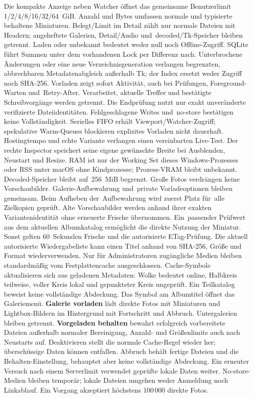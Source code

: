 \documentclass[11pt,a4paper]{article}
\newcommand{\ui}[1]{\textbf{#1}}
\begin{document}
Die kompakte Anzeige neben Watcher öffnet das gemeinsame Benutzerlimit
1/2/4/8/16/32/64~GiB. Anzahl und Bytes umfassen normale und typisierte behaltene
Miniaturen. Belegt/Limit im Detail zählt nur normale Dateien mit Headern;
angeheftete Galerien, Detail/Audio und~decoded/Tk-Speicher
bleiben getrennt. Laden oder unbekannt bedeutet weder null noch Offline-Zugriff.
SQLite führt Summen unter dem vorhandenen Lock per Differenz nach. Unterbrochene
Änderungen oder eine neue Verzeichnisgeneration verlangen begrenzten,
abbrechbaren Metadatenabgleich außerhalb Tk; der Index ersetzt weder Zugriff
noch SHA-256. Vorladen zeigt sofort Aktivität, auch bei Prüfungen,
Foreground-Warten und~Retry-After. Verarbeitet, aktuelle Treffer und bestätigte
Schreibvorgänge werden getrennt. Die Endprüfung nutzt nur exakt unveränderte
verifizierte Dateiidentitäten. Fehlgeschlagene Writes und~no-store bestätigen
keine Vollständigkeit. Serielles FIFO erhält Viewport/Watcher-Zugriff;
spekulative Warm-Queues blockieren explizites Vorladen nicht dauerhaft.
Hostingtempo und echte Variante verlangen einen vereinbarten Live-Test.
Der rechte Inspector speichert seine eigene gewünschte Breite bei Ausblenden,
Neustart und Resize. RAM ist nur der Working Set dieses Windows-Prozesses
oder RSS unter macOS ohne Kindprozesse; Prozess-VRAM bleibt unbekannt.
Decoded-Speicher bleibt auf~256~MiB begrenzt.
Große Fotos verdrängen keine Vorschaubilder. Galerie-Aufbewahrung und~private
Vorladeoptionen bleiben gemeinsam. Beim Aufheben der~Aufbewahrung wird zuerst
Platz für~alle Zielkopien geprüft. Alte Vorschaubilder werden anhand ihrer
exakten Variantenidentität ohne erneuerte Frische übernommen. Ein~passender Prüfwert aus
dem aktuellen Albumkatalog ermöglicht die direkte Nutzung der Miniatur.
Sonst gelten 60~Sekunden Frische und die autorisierte ETag-Prüfung.
Die aktuell autorisierte Wiedergabeliste kann einen Titel anhand von SHA-256,
Größe und Format wiederverwenden. Nur für Administratoren zugängliche Medien
bleiben standardmäßig vom Festplattencache ausgeschlossen.
Cache-Symbole aktualisieren sich aus geladenen Metadaten: Wolke bedeutet
online, Halbkreis teilweise, voller Kreis lokal und gepunkteter Kreis
ungeprüft. Ein Teilkatalog beweist keine vollständige Abdeckung. Das Symbol
am Albumtitel öffnet das Galeriemenü.
\ui{Galerie vorladen} lädt direkte Fotos mit Miniaturen und Lightbox-Bildern
im Hintergrund mit Fortschritt und Abbruch. Untergalerien bleiben getrennt.
\ui{Vorgeladen behalten} bewahrt erfolgreich vorbereitete Dateien außerhalb
normaler Bereinigung, Anzahl- und Größenlimits auch nach Neustarts auf.
Deaktivieren stellt die normale Cache-Regel wieder her; überschüssige Daten
können entfallen. Abbruch behält fertige Dateien und die Behalten-Einstellung,
behauptet aber keine vollständige Abdeckung. Ein erneuter Versuch nach einem
Serverlimit verwendet geprüfte lokale Daten weiter. No-store-Medien bleiben
temporär; lokale Dateien umgehen weder Anmeldung noch Linkablauf. Ein Vorgang
akzeptiert höchstens 100\,000 direkte Fotos.
\end{document}
